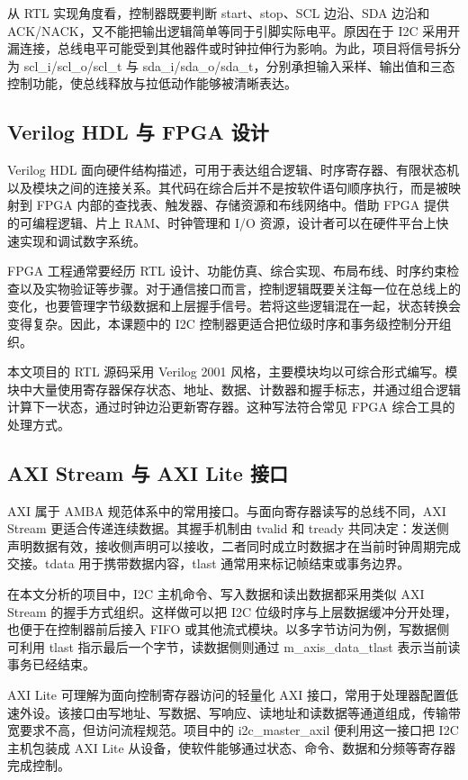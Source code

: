 \documentclass[12pt,a4paper]{article}
\numberwithin{equation}{section}
\begin{document}
从 RTL 实现角度看，控制器既要判断 start、stop、SCL 边沿、SDA 边沿和
ACK/NACK，又不能把输出逻辑简单等同于引脚实际电平。原因在于 I2C
采用开漏连接，总线电平可能受到其他器件或时钟拉伸行为影响。为此，项目将信号拆分为
scl\_i/scl\_o/scl\_t 与
sda\_i/sda\_o/sda\_t，分别承担输入采样、输出值和三态控制功能，使总线释放与拉低动作能够被清晰表达。

\subsection{Verilog HDL 与 FPGA
设计}\label{verilog-hdl-ux4e0e-fpga-ux8bbeux8ba1}

Verilog HDL
面向硬件结构描述，可用于表达组合逻辑、时序寄存器、有限状态机以及模块之间的连接关系。其代码在综合后并不是按软件语句顺序执行，而是被映射到
FPGA 内部的查找表、触发器、存储资源和布线网络中。借助 FPGA
提供的可编程逻辑、片上 RAM、时钟管理和 I/O
资源，设计者可以在硬件平台上快速实现和调试数字系统。

FPGA 工程通常要经历 RTL
设计、功能仿真、综合实现、布局布线、时序约束检查以及实物验证等步骤。对于通信接口而言，控制逻辑既要关注每一位在总线上的变化，也要管理字节级数据和上层握手信号。若将这些逻辑混在一起，状态转换会变得复杂。因此，本课题中的
I2C 控制器更适合把位级时序和事务级控制分开组织。

本文项目的 RTL 源码采用 Verilog 2001
风格，主要模块均以可综合形式编写。模块中大量使用寄存器保存状态、地址、数据、计数器和握手标志，并通过组合逻辑计算下一状态，通过时钟边沿更新寄存器。这种写法符合常见
FPGA 综合工具的处理方式。

\subsection{AXI Stream 与 AXI Lite
接口}\label{axi-stream-ux4e0e-axi-lite-ux63a5ux53e3}

AXI 属于 AMBA 规范体系中的常用接口。与面向寄存器读写的总线不同，AXI
Stream 更适合传递连续数据。其握手机制由 tvalid
和 tready
共同决定：发送侧声明数据有效，接收侧声明可以接收，二者同时成立时数据才在当前时钟周期完成交接。tdata
用于携带数据内容，tlast
通常用来标记帧结束或事务边界。

在本文分析的项目中，I2C 主机命令、写入数据和读出数据都采用类似 AXI
Stream 的握手方式组织。这样做可以把 I2C
位级时序与上层数据缓冲分开处理，也便于在控制器前后接入 FIFO
或其他流式模块。以多字节访问为例，写数据侧可利用
tlast 指示最后一个字节，读数据侧则通过
m\_axis\_data\_tlast 表示当前读事务已经结束。

AXI Lite 可理解为面向控制寄存器访问的轻量化 AXI
接口，常用于处理器配置低速外设。该接口由写地址、写数据、写响应、读地址和读数据等通道组成，传输带宽要求不高，但访问流程规范。项目中的
i2c\_master\_axil 便利用这一接口把 I2C
主机包装成 AXI Lite
从设备，使软件能够通过状态、命令、数据和分频等寄存器完成控制。
\end{document}
